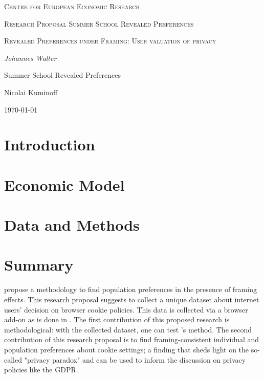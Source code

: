 \documentclass[12pt,a4paper]{article}
\author{Johannes Walter}
\begin{document}
\begin{titlepage}
    \centering
    \vspace{5cm}
    {\scshape Centre for European Economic Research \par}
    \vspace{0.5cm}
    {\scshape Research Proposal Summer School Revealed Preferences \par}
    \vspace{1.5cm}
    {\scshape\LARGE Revealed Preferences under Framing: User valuation of privacy \par}
    \vspace{2cm}
    {\itshape Johannes Walter \par}
    \vspace{1cm}
 

    \vfill
    Summer School Revealed Preferences \par 
    Nicolai Kuminoff 
    \vfill

    {\large \today\par}
\end{titlepage}


\section{Introduction}
\label{introduction}


\section{Economic Model}
\label{model}


\section{Data and Methods}
\label{data and methods}


\section{Summary}\label{sum}

\textcite{goldin2020} propose a methodology to find population preferences in the presence of framing effects. This research proposal suggests to collect a unique dataset
about internet users' decision on browser cookie policies. This data is collected via a browser add-on as is done in \textcite{levy2020}. The first contribution of this proposed
research is methodological: with the collected dataset, one can test \textcite{goldin2020}'s method. The second contribution of this research proposal is to
find framing-consistent individual and population preferences about cookie settings; a finding that sheds light on the so-called "privacy paradox" and can be used to inform the discussion on privacy policies like the GDPR.

\printbibliography
\end{document}
